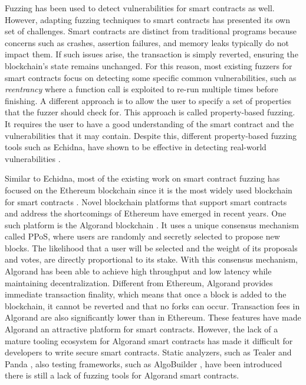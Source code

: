 Fuzzing has been used to detect vulnerabilities for smart contracts as well.
However, adapting fuzzing techniques to smart contracts has presented its own set of challenges.
Smart contracts are distinct from traditional programs because concerns such as crashes, assertion failures, and memory leaks typically do not impact them.
If such issues arise, the transaction is simply reverted, ensuring the blockchain's state remains unchanged.
For this reason, most existing fuzzers for smart contracts focus on detecting some specific common vulnerabilities, such as \textit{reentrancy} where a function call is exploited to re-run multiple times before finishing.
A different approach is to allow the user to specify a set of properties that the fuzzer should check for.
This approach is called property-based fuzzing.
It requires the user to have a good understanding of the smart contract and the vulnerabilities that it may contain.
Despite this, different property-based fuzzing tools such as Echidna, have shown to be effective in detecting real-world vulnerabilities \cite{grieco_echidna_2020, noauthor_echidna_nodate}.

Similar to Echidna, most of the existing work on smart contract fuzzing has focused on the Ethereum blockchain since it is the most widely used blockchain for smart contracts \cite{guo_analysis_2022}.
Novel blockchain platforms that support smart contracts and address the shortcomings of Ethereum have emerged in recent years.
One such platform is the Algorand blockchain \cite{chen_algorand_2019}.
It uses a unique consensus mechanism called \ac{PPoS}, where users are randomly and secretly selected to propose new blocks.
The likelihood that a user will be selected and the weight of its proposals and votes, are directly proportional to its stake.
With this consensus mechanism, Algorand has been able to achieve high throughput and low latency while maintaining decentralization.
Different from Ethereum, Algorand provides immediate transaction finality, which means that once a block is added to the blockchain, it cannot be reverted and that no forks can occur.
Transaction fees in Algorand are also significantly lower than in Ethereum.
These features have made Algorand an attractive platform for smart contracts.
However, the lack of a mature tooling ecosystem for Algorand smart contracts has made it difficult for developers to write secure smart contracts.
Static analyzers, such as Tealer \cite{noauthor_crytictealer_nodate} and Panda \cite{sun_panda_2023}, also testing frameworks, such as AlgoBuilder \cite{noauthor_algo_nodate}, have been introduced there is still a lack of fuzzing tools for Algorand smart contracts.

